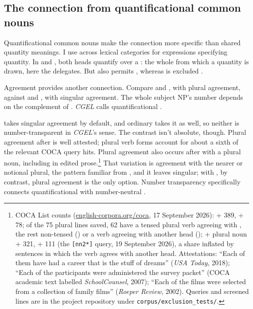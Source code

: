 \documentclass[12pt]{article}
\begin{document}
\subsection{The connection from quantificational common nouns}\label{sec:quant-nouns}

Quantificational common nouns make the connection more specific than shared quantity meanings. I use  across lexical categories for expressions specifying quantity. In  and , both heads quantify over a : the whole from which a quantity is drawn, here the delegates. But  also permits , whereas  is excluded \citep[349]{huddleston2002}.

Agreement provides another connection. Compare  and , with plural agreement, against  and , with singular agreement. The whole subject NP's number depends on the complement of . \textit{CGEL} calls quantificational   \citep[349--350, 501--503]{huddleston2002}.

 takes singular agreement by default, and ordinary  takes it as well, so neither is number-transparent in \textit{CGEL}'s sense. The contrast isn't absolute, though. Plural agreement after  is well attested; plural verb forms account for about a sixth of the relevant COCA query hits. Plural agreement also occurs after  with a plural noun, including in edited prose.\footnote{COCA List counts (\href{https://www.english-corpora.org/coca/}{english-corpora.org/coca}, 17 September 2026):  +  389, +  78; of the 75 plural lines saved, 62 have a tensed plural verb agreeing with , the rest non-tensed  () or a verb agreeing with another head ();  + plural noun +  321, +  111 (the \texttt{[nn2*]} query, 19 September 2026), a share inflated by sentences in which the verb agrees with another head. Attestations: \enquote{Each of them have had a career that is the stuff of dreams} (\textit{USA Today}, 2018); \enquote{Each of the participants were administered the survey packet} (COCA academic text labelled \textit{SchoolCounsel}, 2007); \enquote{Each of the films were selected from a collection of family films} (\textit{Roeper Review}, 2002). Queries and screened lines are in the project repository under \texttt{corpus/exclusion\_tests/}.} That variation is agreement with the nearer or notional plural, the pattern familiar from , and it leaves  singular; with , by contrast, plural agreement is the only option. Number transparency specifically connects quantificational  with number-neutral .
\end{document}
